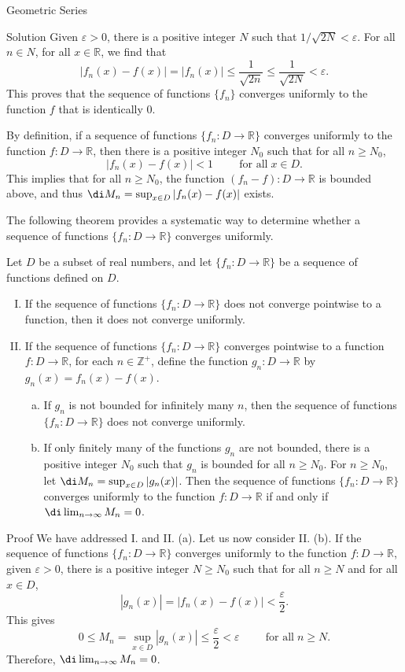 \begin{example}[label=230305_16]{Geometric Series}
\begin{solution}{Solution}
Given $\varepsilon>0$, there is a positive integer $N$ such that $1/\sqrt{2N}<\varepsilon$. For all $n\in N$, for all $x\in\mathbb{R}$, we find that
\bs
\[|f_n(x)-f(x)|=|f_n(x)|\leq \frac{1}{\sqrt{2n}}\leq\frac{1}{\sqrt{2N}}<\varepsilon.\]
This proves that  the sequence of functions $\{f_n\}$ converges uniformly to the function $f$ that is identically 0.

\end{solution}

 By definition, if a sequence of functions $\{f_n:D\to\mathbb{R}\}$ converges uniformly to the function $f:D\to\mathbb{R}$, then there is a positive integer $N_0$ such that for all $n\geq N_0$, 
\[|f_n(x)-f(x)|<1\hspace{1cm}\text{for all}\;x\in D.\]
This implies that for all $n\geq N_0$, the function $(f_n-f):D\to\mathbb{R}$ is bounded above, and thus $\di M_n=\sup_{x\in D}|f_n(x)-f(x)|$ exists. 

The following theorem provides a systematic way to determine whether a sequence of functions $\{f_n:D\to\mathbb{R}\}$ converges uniformly.
\begin{theorem}[label=230303_9]{}
Let $D$ be a subset of real numbers, and let $\{f_n:D\to\mathbb{R}\}$ be a sequence of functions defined on $D$.
\begin{enumerate}[I.]
\item
If the sequence of functions $\{f_n:D\to\mathbb{R}\}$ does not converge pointwise to a function, then it does not converge uniformly.
\item If the sequence of functions $\{f_n:D\to\mathbb{R}\}$  converges pointwise to a function $f:D\to\mathbb{R}$, for each $n\in\mathbb{Z}^+$, define the function $g_n:D\to\mathbb{R}$ by $g_n(x)=f_n(x)-f(x)$.
\begin{enumerate}[(a)]
\item
If $g_n$ is not bounded for infinitely many $n$, then  the sequence of functions $\{f_n:D\to\mathbb{R}\}$ does not converge uniformly.
\item If only finitely many of the functions $g_n$ are not bounded, there is a positive integer $N_0$ such that $g_n$ is bounded for all $n\geq N_0$. For $n\geq N_0$, let $\di M_n=\sup_{x\in D}|g_n(x)|$. Then the  sequence of functions $\{f_n:D\to\mathbb{R}\}$  converges uniformly to the function $f:D\to\mathbb{R}$ if and only if $\di\lim_{n\to\infty}M_n=0$.
\end{enumerate}
\end{enumerate}
\end{theorem}
\begin{myproof}{Proof}
We have addressed I. and II. (a). Let us now consider II. (b). If the    sequence of functions $\{f_n:D\to\mathbb{R}\}$  converges uniformly to the function $f:D\to\mathbb{R}$, given $\varepsilon>0$, there is a positive integer $N\geq N_0$ such that for all $n\geq N$ and for all $x\in D$,
\[|g_n(x)|=|f_n(x)-f(x)|<\frac{\varepsilon}{2}.\]
This gives 
\[0\leq M_n=\sup_{x\in D}|g_n(x)|\leq\frac{\varepsilon}{2}<\varepsilon\hspace{1cm}\text{for all}\;n\geq N.\]
Therefore, $\di\lim_{n\to\infty}M_n=0$.
 

\end{myproof}
\end{example}
